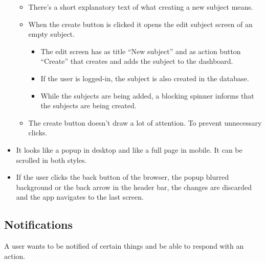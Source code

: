 \begin{itemize}[leftmargin=2cm]
    \begin{itemize}[leftmargin=2cm]
        \item[\nextTask{}\label{req:x}] There's a short explanatory text of what creating a new subject means.
        \item[\nextTask{}\label{req:x}] When the create button is clicked it opens the edit subject screen of an empty subject. 
        \begin{itemize}[leftmargin=2cm]
            \item[\nextTask{}\label{req:x}] The edit screen has as title ``New subject'' and as action button ``Create'' that creates and adds the subject to the dashboard.
            \item[\nextTask{}\label{req:x}] If the user is logged-in, the subject is also created in the database. 
            \item[\nextTask{}\label{req:x}] While the subjects are being added, a blocking spinner informs that the subjects are being created.
        \end{itemize}
        \item[\nextTask{}\label{req:x}] The create button doesn't draw a lot of attention. To prevent unnecessary clicks.
    \end{itemize}
    \item[\nextTask{}\label{req:x}] It looks like a popup in desktop and like a full page in mobile. It can be scrolled in both styles.
    \item[\nextTask{}\label{req:x}] If the user clicks the back button of the browser, the popup blurred background or the back arrow in the header bar, the changes are discarded and the app navigates to the last screen.
\end{itemize}

\subsection*{Notifications}
A user wants to be notified of certain things and be able to respond with an action.

